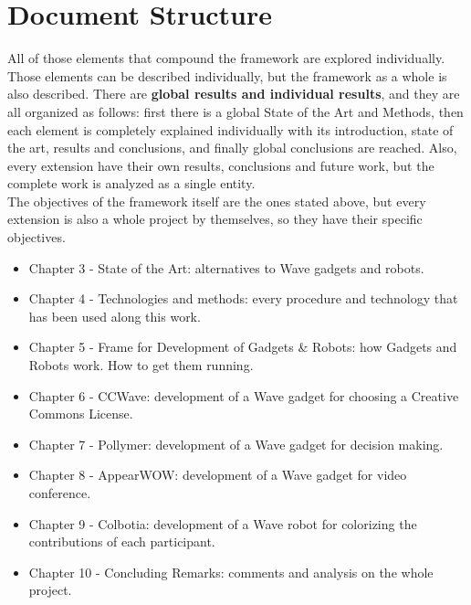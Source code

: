 \section{Document Structure}
All of those elements that compound the framework are explored individually. Those elements can be described individually, but the framework as a whole is also described. There are \textbf{global results and individual results}, and they are all organized as follows: first there is a global State of the Art and Methods, then each element is completely explained individually with its introduction, state of the art, results and conclusions, and finally global conclusions are reached. Also, every extension have their own results, conclusions and future work, but the complete work is analyzed as a single entity.\\[.2cm]
The objectives of the framework itself are the ones stated above, but every extension is also a whole project by themselves, so they have their specific objectives.
\begin{itemize}
  \item Chapter 3 - State of the Art: alternatives to Wave gadgets and robots.
  \item Chapter 4 - Technologies and methods: every procedure and technology that has been used along this work.
  \item Chapter 5 - Frame for Development of Gadgets \& Robots: how Gadgets and Robots work. How to get them running.
  \item Chapter 6 - CCWave: development of a Wave gadget for choosing a Creative Commons License.
  \item Chapter 7 - Pollymer: development of a Wave gadget for decision making.
  \item Chapter 8 - AppearWOW: development of a Wave gadget for video conference.
  \item Chapter 9 - Colbotia: development of a Wave robot for colorizing the contributions of each participant.
  \item Chapter 10 - Concluding Remarks: comments and analysis on the whole project.
\end{itemize}

\newpage
\thispagestyle{sectioned}

